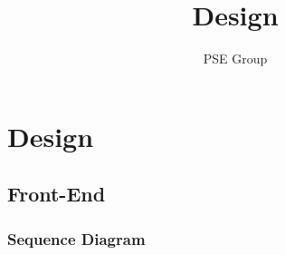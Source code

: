 \documentclass[twoside, english, draft]{design}
\author{PSE Group}
\title{
Design}
\begin{document}
\nocite{*}

\setpdf

\maketitle


\thispagestyle{empty}
\begin{abstract}
\thispagestyle{empty}
\end{abstract}

\thispagestyle{empty}
\newpage
\thispagestyle{empty}
\tableofcontents
\cleardoublepage
\setcounter{page}{1}


\section{Design}\label{sec:intro}
\subsection{Front-End}
\subsubsection{Sequence Diagram}
\end{document}

